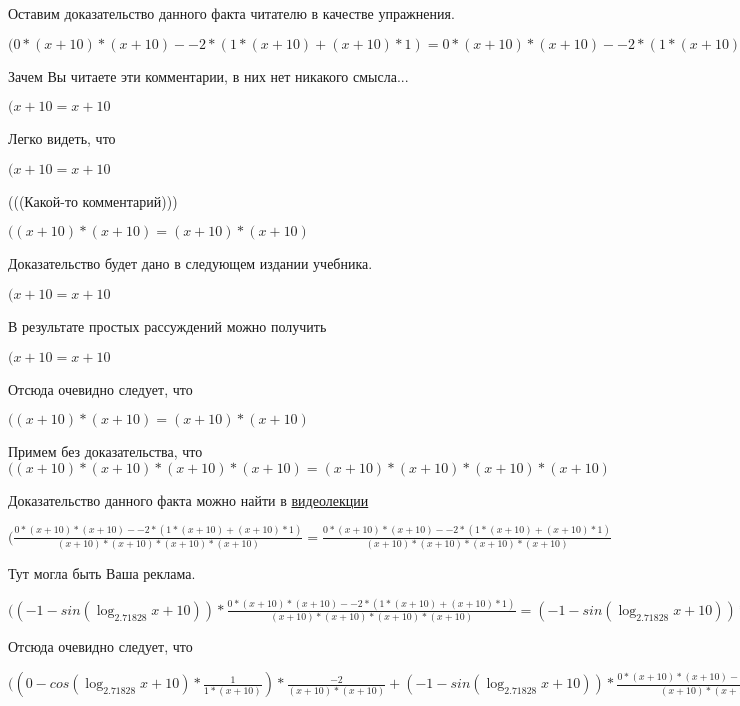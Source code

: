\documentclass[12pt,a4paper,fleqn]{article}
\theoremstyle{definition}
\begin{document}
Оставим доказательство данного факта читателю в качестве упражнения.

$( 0  * ( x  +  10 ) * ( x  +  10 ) -  -2  * ( 1  * ( x  +  10 ) + ( x  +  10 ) *  1 ) =  0  * ( x  +  10 ) * ( x  +  10 ) -  -2  * ( 1  * ( x  +  10 ) + ( x  +  10 ) *  1 )$

Зачем Вы читаете эти комментарии, в них нет никакого смысла...

$( x  +  10  =  x  +  10 $

Легко видеть, что

$( x  +  10  =  x  +  10 $

(((Какой-то комментарий)))

$(( x  +  10 ) * ( x  +  10 ) = ( x  +  10 ) * ( x  +  10 )$

Доказательство будет дано в следующем издании учебника.

$( x  +  10  =  x  +  10 $

В результате простых рассуждений можно получить

$( x  +  10  =  x  +  10 $

Отсюда очевидно следует, что

$(( x  +  10 ) * ( x  +  10 ) = ( x  +  10 ) * ( x  +  10 )$

Примем без доказательства, что
$(( x  +  10 ) * ( x  +  10 ) * ( x  +  10 ) * ( x  +  10 ) = ( x  +  10 ) * ( x  +  10 ) * ( x  +  10 ) * ( x  +  10 )$

Доказательство данного факта можно найти в \href{https://www.youtube.com/watch?v=dQw4w9WgXcQ}{видеолекции}

$(\frac{ 0  * ( x  +  10 ) * ( x  +  10 ) -  -2  * ( 1  * ( x  +  10 ) + ( x  +  10 ) *  1 )}{( x  +  10 ) * ( x  +  10 ) * ( x  +  10 ) * ( x  +  10 )}
 = \frac{ 0  * ( x  +  10 ) * ( x  +  10 ) -  -2  * ( 1  * ( x  +  10 ) + ( x  +  10 ) *  1 )}{( x  +  10 ) * ( x  +  10 ) * ( x  +  10 ) * ( x  +  10 )}
$

Тут могла быть Ваша реклама.

$(( -1  - sin(\log_{ 2.71828 }{ x  +  10 })) * \frac{ 0  * ( x  +  10 ) * ( x  +  10 ) -  -2  * ( 1  * ( x  +  10 ) + ( x  +  10 ) *  1 )}{( x  +  10 ) * ( x  +  10 ) * ( x  +  10 ) * ( x  +  10 )}
 = ( -1  - sin(\log_{ 2.71828 }{ x  +  10 })) * \frac{ 0  * ( x  +  10 ) * ( x  +  10 ) -  -2  * ( 1  * ( x  +  10 ) + ( x  +  10 ) *  1 )}{( x  +  10 ) * ( x  +  10 ) * ( x  +  10 ) * ( x  +  10 )}
$

Отсюда очевидно следует, что

$(( 0  - cos(\log_{ 2.71828 }{ x  +  10 }) * \frac{ 1 }{ 1  * ( x  +  10 )}
) * \frac{ -2 }{( x  +  10 ) * ( x  +  10 )}
 + ( -1  - sin(\log_{ 2.71828 }{ x  +  10 })) * \frac{ 0  * ( x  +  10 ) * ( x  +  10 ) -  -2  * ( 1  * ( x  +  10 ) + ( x  +  10 ) *  1 )}{( x  +  10 ) * ( x  +  10 ) * ( x  +  10 ) * ( x  +  10 )}
 = ( 0  - cos(\log_{ 2.71828 }{ x  +  10 }) * \frac{ 1 }{ 1  * ( x  +  10 )}
) * \frac{ -2 }{( x  +  10 ) * ( x  +  10 )}
 + ( -1  - sin(\log_{ 2.71828 }{ x  +  10 })) * \frac{ 0  * ( x  +  10 ) * ( x  +  10 ) -  -2  * ( 1  * ( x  +  10 ) + ( x  +  10 ) *  1 )}{( x  +  10 ) * ( x  +  10 ) * ( x  +  10 ) * ( x  +  10 )}
$
\end{document}
